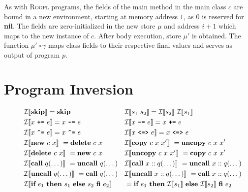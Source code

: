 As with \textsc{Roopl} programs, the fields of the main method in the main class $c$ are bound in a new environment, starting at memory address $1$, as $0$ is reserved for \textbf{nil}. The fields are zero-initialized in the new store $\mu$ and address $i + 1$ which maps to the new instance of $c$. After body execution, store $\mu'$ is obtained. The function $\mu' \circ \gamma$ maps class fields to their respective final values and serves as output of program $p$.


\section{Program Inversion}
\label{sec:program-inversion}
\begin{figure}[ht]
    \begin{align*}
        &\mathcal{I}\llbracket \textbf{skip} \rrbracket = \textbf{skip} &&\mathcal{I}\llbracket s_1\ s_2 \rrbracket = \mathcal{I}\llbracket s_2 \rrbracket\ \mathcal{I}\llbracket s_1 \rrbracket\\
        &\mathcal{I}\llbracket x\ \texttt{\textbf{+=}}\ e \rrbracket = x\ \texttt{\textbf{-=}}\ e &&\mathcal{I}\llbracket x\ \texttt{\textbf{-=}}\ e \rrbracket = x\ \texttt{\textbf{+=}}\ e\\
        &\mathcal{I}\llbracket x\ \texttt{\textbf{\textasciicircum=}}\ e \rrbracket = x\ \texttt{\textbf{\textasciicircum=}}\ e &&\mathcal{I}\llbracket x\ \texttt{\textbf{<=>}}\ e \rrbracket = x\ \texttt{\textbf{<=>}}\ e\\
        &\mathcal{I} \llbracket \textbf{new}\ c\ x\rrbracket\ = \textbf{delete}\ c\ x  &&\mathcal{I} \llbracket \textbf{copy}\ c\ x\ x' \rrbracket\ = \textbf{uncopy}\ c\ x\ x'\\
        &\mathcal{I} \llbracket \textbf{delete}\ c\ x \rrbracket\ = \textbf{new}\ c\ x  &&\mathcal{I} \llbracket \textbf{uncopy}\ c\ x\ x' \rrbracket\ = \textbf{copy}\ c\ x\ x'\\
        &\mathcal{I} \llbracket \textbf{call}\ q(\dots) \rrbracket\ = \textbf{uncall}\ q(\dots) &&\mathcal{I} \llbracket \textbf{call}\ x::q(\dots) \rrbracket\ = \textbf{uncall}\ x::q(\dots)\\
        &\mathcal{I} \llbracket \textbf{uncall}\ q(\dots) \rrbracket\ = \textbf{call}\ q(\dots) &&\mathcal{I} \llbracket \textbf{uncall}\ x::q(\dots) \rrbracket\ = \textbf{call}\ x::q(\dots)\\
        &\mathcal{I} \llbracket \textbf{if}\ e_1\ \textbf{then}\ s_1\ \textbf{else}\ s_2\ \textbf{fi}\ e_2 \rrbracket &&= \textbf{if}\ e_1\ \textbf{then}\ \mathcal{I}\llbracket s_1 \rrbracket\ \textbf{else}\ \mathcal{I}\llbracket s_2 \rrbracket\ \textbf{fi}\ e_2\\

\end{align*}
\end{figure}
